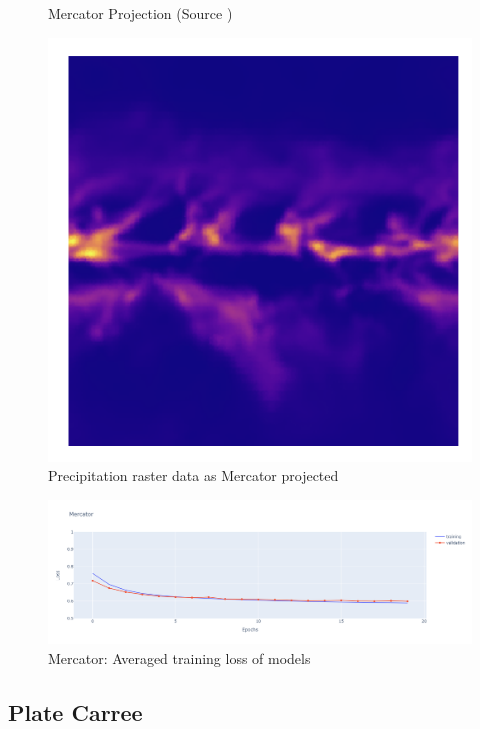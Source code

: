 \begin{figure}[H]
\begin{minipage}{0.30\textwidth}
        \caption{Mercator Projection (Source \cite{PROJ_SITE})}
        \label{fig:merc_proj}
    \end{minipage}\hfill
    \begin{minipage}{0.30\textwidth}
        \centering
        \includegraphics[width=0.9\linewidth]{figures/chapter-8/prect_mercator.png}
        \caption{Precipitation raster data as Mercator projected}
        \label{fig:merc_prect_raster}
    \end{minipage}\hfill
\end{figure}

\begin{figure}[H]
    \centering
    \includegraphics[width=1.0\linewidth]{figures/chapter-8/merc_loss.png}
    \caption{Mercator: Averaged training loss of models  }
    \label{fig:merc_loss}
\end{figure}

\newpage

\subsection{Plate Carree}

